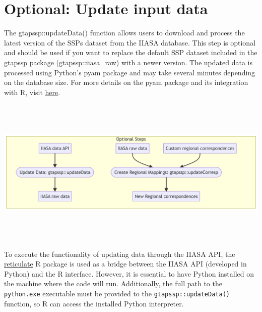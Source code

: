 \documentclass[
  letterpaper,
  DIV=11,
  numbers=noendperiod]{scrartcl}
\begin{document}
\section{Optional: Update input data}\label{optional-update-input-data}

The gtapssp::updateData() function allows users to download and process
the latest version of the SSPs dataset from the IIASA database. This
step is optional and should be used if you want to replace the default
SSP dataset included in the gtapssp package (gtapssp::iiasa\_raw) with a
newer version. The updated data is processed using Python's pyam package
and may take several minutes depending on the database size. For more
details on the pyam package and its integration with R, visit
\href{https://pyam-iamc.readthedocs.io/en/stable/R_tutorials/pyam_R_tutorial.html}{here}.

\label{optinional}
\includegraphics[width=9.29in,height=2.79in]{index_files/figure-latex/mermaid-figure-2.png}

To execute the functionality of updating data through the IIASA API, the
\href{https://rstudio.github.io/reticulate/}{reticulate} R package is
used as a bridge between the IIASA API (developed in Python) and the R
interface. However, it is essential to have Python installed on the
machine where the code will run. Additionally, the full path to the
\texttt{python.exe} executable must be provided to the
\texttt{gtapssp::updateData()} function, so R can access the installed
Python interpreter.
\end{document}
